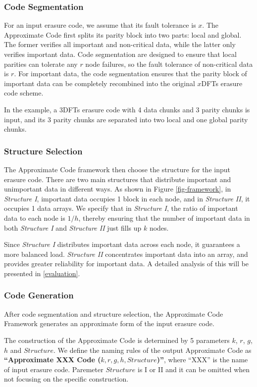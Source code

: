 \documentclass[sigconf]{acmart}
\begin{document}
\subsubsection{Code Segmentation}
For an input erasure code, we assume that its fault tolerance is $x$. The Approximate Code first splits its parity block into two parts: local and global. The former verifies all important and non-critical data, while the latter only verifies important data. Code segmentation are designed to ensure that local parities can tolerate any $r$ node failures, so the fault tolerance of non-critical data is $r$. For important data, the code segmentation ensures that the parity block of important data can be completely recombined into the original $x$DFTs erasure code scheme. 

In the example, a 3DFTs erasure code with 4 data chunks and 3 parity chunks is input, and its 3 parity chunks are separated into two local and one global parity chunks.

\subsubsection{Structure Selection}
The Approximate Code framework then choose the structure for the input erasure code.
There are two main structures that distribute important and unimportant data in different ways.
As shown in Figure \ref{fig-framework}, in \emph{Structure I}, important data occupies 1 block in each node, and in \emph{Structure II}, it occupies 1 data arrays.
We specify that in \emph{Structure I}, the ratio of important data to each node is $1/h$, thereby ensuring that the number of important data in both \emph{Structure I} and \emph{Structure II} just fills up $k$ nodes.

Since \emph{Structure I} distributes important data across each node, it guarantees a more balanced load. \emph{Structure II} concentrates important data into an array, and provides greater reliability for important data. A detailed analysis of this will be presented in \ref{evaluation}.

\subsubsection{Code Generation}
After code segmentation and structure selection, the Approximate Code Framework generates an approximate form of the input erasure code.

The construction of the Approximate Code is determined by 5 parameters $k$, $r$, $g$, $h$ and $Structure$. 
We define the naming rules of the output Approximate Code as \textbf{``Approximate XXX Code ($k,r,g,h, Structure$)''}, where ``XXX'' is the name of input erasure code. Paremeter $Structure$ is I or II and it can be omitted when not focusing on the specific construction.
\end{document}
